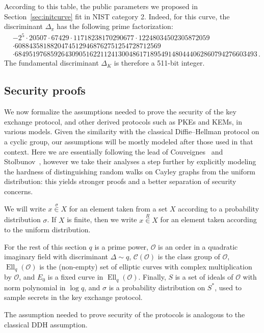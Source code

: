 \documentclass{article}
\newcommand{\Cl}{\mathcal{C}}
\renewcommand{\O}{\mathcal{O}}
\newcommand{\rand}[1]{\overset{#1}{∈}}
\newcommand{\uni}{\rand{R}}
\theoremstyle{definition}
\DeclareMathOperator{\Ell}{Ell}
\begin{document}
According to this table, the public parameters we proposed
in Section~\ref{sec:initcurve} fit in NIST category 2.
Indeed, for this curve, the discriminant $\Delta_\pi$ 
has the following prime factorization:
\[
\begin{aligned}
& -2^5 \cdot 20507 \cdot 67429 \cdot 11718238170290677 \cdot 12248034502305872059 \\
& \cdot 60884358188204745129468762751254728712569\\
& \cdot 68495197685926430905162211241300486171895491480444062860794276603493\,.
\end{aligned}
\]
The fundamental discriminant $\Delta_K$ is therefore a 511-bit integer.

\subsection{Security proofs}
\label{sec:proofs}

We now formalize the assumptions needed to prove the security of the
key exchange protocol, and other derived protocols such as PKEs and
KEMs, in various models. Given the similarity with the classical
Diffie--Hellman protocol on a cyclic group, our assumptions will be
mostly modeled after those used in that context. Here we are
essentially following the lead of
Couveignes~\cite{cryptoeprint:2006:291} and
Stolbunov~\cite{Stol,Stolbunov2012}, however we take their analyses a
step further by explicitly modeling the hardness of distinguishing
random walks on Cayley graphs from the uniform distribution: this
yields stronger proofs and a better separation of security concerns.

We will write $x\rand{σ} X$ for an element taken from a set $X$
according to a probability distribution $σ$. If $X$ is finite,
then we write $x\uni X$ for an element taken according to the uniform
distribution.

For the rest of this section $q$ is a prime power, $\O$ is an order in
a quadratic imaginary field with discriminant $Δ\sim q$, $\Cl(\O)$ is
the class group of $\O$, $\Ell_q(\O)$ is the (non-empty) set of
elliptic curves with complex multiplication by $\O$, and $E_0$ is a
fixed curve in $\Ell_q(\O)$. Finally, $S$ is a set of ideals of $\O$
with norm polynomial in $\log q$, and $σ$ is a probability
distribution on $S^*$, used to sample secrets in the key exchange
protocol.

The assumption needed to prove security of the protocols is analogous
to the classical DDH assumption.
\end{document}
